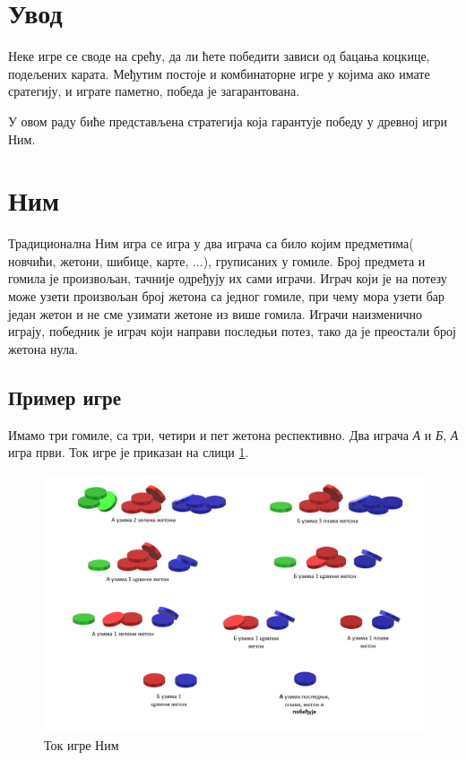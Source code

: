 \documentclass[a4paper]{article}
\begin{document}

\newpage
{}
\tableofcontents

\newpage
{}
\section{Увод}
\label{sec:uvod}

Неке игре се своде на срећу, да ли ћете победити зависи од бацања коцкице, подељених карата. Међутим постоје и комбинаторне игре у којима ако имате сратегију, и играте паметно, победа је загарантована.

У овом раду биће представљена стратегија која гарантује победу у древној игри Ним.

\section{Ним}

Традиционална Ним игра се игра у два играча са било којим предметима( новчићи, жетони, шибице, карте, ...), груписаних у гомиле. Број предмета и гомила је произвољан, тачније одређују их сами играчи. Играч који је на потезу може узети произвољан број жетона са једног гомиле, при чему мора узети бар један жетон и не сме узимати жетоне из више гомила. Играчи наизменично играју, победник је играч који направи последњи потез, тако да је преостали број жетона нула.

\subsection{Пример игре}

Имамо три гомиле, са три, четири и пет жетона респективно. Два играча \textit{А} и \textit{Б}, \textit{А} игра први. Ток игре је приказан на слици \ref{fig:nimPrimer}.

\begin{figure}[H]
	\caption{Ток игре Ним}
	\label{fig:nimPrimer}
	\begin{center}
		\includegraphics[width=\textwidth]{NimPrimer.png}
	\end{center}
\end{figure}
\end{document}

